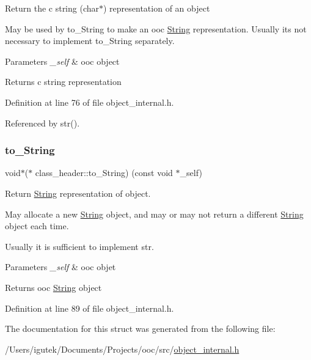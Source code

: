 Return the c string (char$\ast$) representation of an object

May be used by to\+\_\+\+String to make an ooc \mbox{\hyperlink{structString}{String}} representation. Usually it\textquotesingle{}s not necessary to implement to\+\_\+\+String separately.


\begin{DoxyParams}{Parameters}
{\em \+\_\+self} & ooc object \\
\hline
\end{DoxyParams}
\begin{DoxyReturn}{Returns}
c string representation 
\end{DoxyReturn}


Definition at line 76 of file object\+\_\+internal.\+h.



Referenced by str().

\mbox{\label{structclass__header_a67a4f888ffa78b4905bc3585fe1f17a4}} 
\subsubsection{\texorpdfstring{to\+\_\+\+String}{to\_String}}
{\footnotesize\ttfamily void$\ast$($\ast$ class\+\_\+header\+::to\+\_\+\+String) (const void $\ast$\+\_\+self)}

Return \mbox{\hyperlink{structString}{String}} representation of object.

May allocate a new \mbox{\hyperlink{structString}{String}} object, and may or may not return a different \mbox{\hyperlink{structString}{String}} object each time.

Usually it is sufficient to implement str.


\begin{DoxyParams}{Parameters}
{\em \+\_\+self} & ooc objet \\
\hline
\end{DoxyParams}
\begin{DoxyReturn}{Returns}
ooc \mbox{\hyperlink{structString}{String}} object 
\end{DoxyReturn}


Definition at line 89 of file object\+\_\+internal.\+h.



The documentation for this struct was generated from the following file\+:\begin{DoxyCompactItemize}
\item 
/\+Users/igutek/\+Documents/\+Projects/ooc/src/\mbox{\hyperlink{object__internal_8h}{object\+\_\+internal.\+h}}\end{DoxyCompactItemize}
